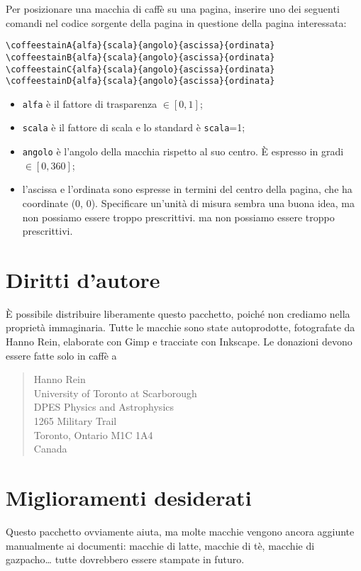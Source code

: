\documentclass[a4paper, 11pt, BCOR = 0 pt, oneside]{scrartcl}
\begin{document}
Per posizionare una macchia di caffè su una pagina, inserire uno dei seguenti comandi nel codice sorgente della pagina in questione della pagina interessata:
\begin{verbatim}
\coffeestainA{alfa}{scala}{angolo}{ascissa}{ordinata}
\coffeestainB{alfa}{scala}{angolo}{ascissa}{ordinata}
\coffeestainC{alfa}{scala}{angolo}{ascissa}{ordinata}
\coffeestainD{alfa}{scala}{angolo}{ascissa}{ordinata}
\end{verbatim}

\begin{itemize}
\item \texttt{alfa} è il fattore di trasparenza $\in [0,1]$;
\item \texttt{scala} è il fattore di scala e lo standard è \texttt{scala}=1;
\item \texttt{angolo} è l'angolo della macchia rispetto al suo centro. È espresso in gradi $\in [0,360]$;
\item l'ascissa e l'ordinata sono espresse in termini del centro della pagina, che ha coordinate (0, 0). Specificare un'unità di misura sembra una buona idea, ma non possiamo essere troppo prescrittivi. ma non possiamo essere troppo prescrittivi.
\end{itemize}


\section{Diritti d'autore}
È possibile distribuire liberamente questo pacchetto, poiché non crediamo nella
proprietà immaginaria. Tutte le macchie sono state autoprodotte, fotografate da
Hanno Rein, elaborate con Gimp e tracciate con Inkscape. Le donazioni devono
essere fatte solo in caffè a
\begin{quote}
Hanno Rein\\
University of Toronto at Scarborough\\
DPES Physics and Astrophysics\\
1265 Military Trail\\
Toronto, Ontario M1C 1A4\\
Canada
\end{quote}

\section{Miglioramenti desiderati}
Questo pacchetto ovviamente aiuta, ma molte macchie vengono ancora aggiunte
manualmente ai documenti: macchie di latte, macchie di tè, macchie di
gazpacho\dots{} tutte dovrebbero essere stampate in futuro.
\end{document}
